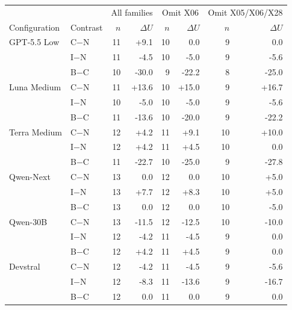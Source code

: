 \begin{tabular}{llrrrrrr}
\toprule
& & \multicolumn{2}{c}{All families} & \multicolumn{2}{c}{Omit X06} & \multicolumn{2}{c}{Omit X05/X06/X28}\\
Configuration & Contrast & $n$ & $\Delta U$ & $n$ & $\Delta U$ & $n$ & $\Delta U$\\
\midrule
GPT-5.5 Low & C$-$N & 11 & +9.1 & 10 & 0.0 & 9 & 0.0\\
 & I$-$N & 11 & -4.5 & 10 & -5.0 & 9 & -5.6\\
 & B$-$C & 10 & -30.0 & 9 & -22.2 & 8 & -25.0\\
Luna Medium & C$-$N & 11 & +13.6 & 10 & +15.0 & 9 & +16.7\\
 & I$-$N & 10 & -5.0 & 10 & -5.0 & 9 & -5.6\\
 & B$-$C & 11 & -13.6 & 10 & -20.0 & 9 & -22.2\\
Terra Medium & C$-$N & 12 & +4.2 & 11 & +9.1 & 10 & +10.0\\
 & I$-$N & 12 & +4.2 & 11 & +4.5 & 10 & 0.0\\
 & B$-$C & 11 & -22.7 & 10 & -25.0 & 9 & -27.8\\
Qwen-Next & C$-$N & 13 & 0.0 & 12 & 0.0 & 10 & +5.0\\
 & I$-$N & 13 & +7.7 & 12 & +8.3 & 10 & +5.0\\
 & B$-$C & 13 & 0.0 & 12 & 0.0 & 10 & -5.0\\
Qwen-30B & C$-$N & 13 & -11.5 & 12 & -12.5 & 10 & -10.0\\
 & I$-$N & 12 & -4.2 & 11 & -4.5 & 9 & 0.0\\
 & B$-$C & 12 & +4.2 & 11 & +4.5 & 9 & 0.0\\
Devstral & C$-$N & 12 & -4.2 & 11 & -4.5 & 9 & -5.6\\
 & I$-$N & 12 & -8.3 & 11 & -13.6 & 9 & -16.7\\
 & B$-$C & 12 & 0.0 & 11 & 0.0 & 9 & 0.0\\
\bottomrule
\end{tabular}
